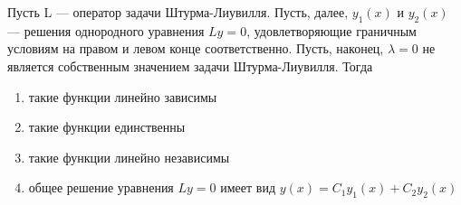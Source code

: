 Пусть L — оператор задачи Штурма-Лиувилля. Пусть, далее, \(y_1(x)\) и \(y_2(x)\) — решения однородного уравнения \(Ly = 0\), удовлетворяющие граничным условиям на правом и левом конце соответственно. Пусть, наконец, \(\lambda = 0\) не является собственным значением задачи Штурма-Лиувилля. Тогда

\begin{enumerate}[label=\arabic*)]
    \item такие функции линейно зависимы
    \item такие функции единственны
    \item такие функции линейно независимы
    \item общее решение уравнения \(Ly = 0\) имеет вид \(y(x) = C_1 y_1(x) + C_2 y_2(x)\)
\end{enumerate}

